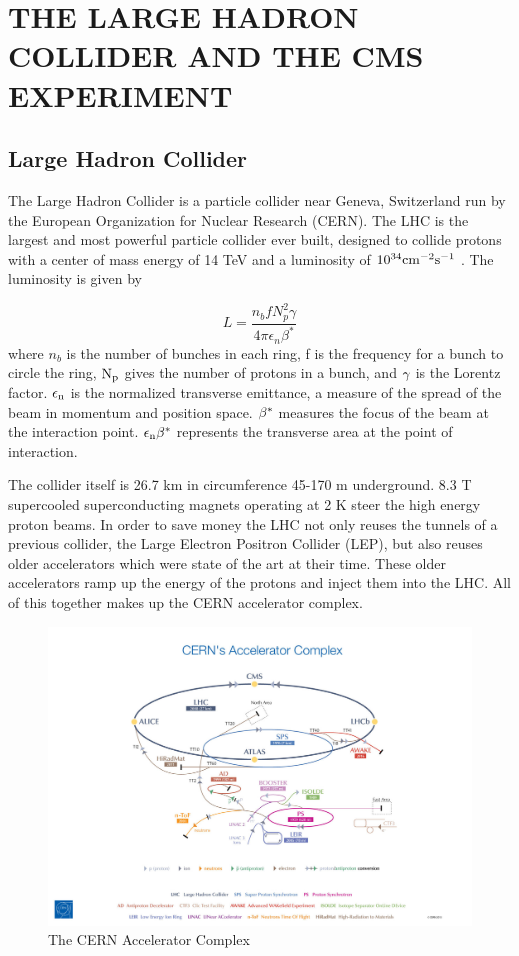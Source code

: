 \chapter{THE LARGE HADRON COLLIDER AND THE CMS EXPERIMENT} \label{lhc-cms}

\section{Large Hadron Collider}
The Large Hadron Collider is a particle collider near Geneva, Switzerland run by the European Organization for Nuclear Research (CERN). The LHC is the largest and most powerful particle collider ever built, designed to collide protons with a center of mass energy of 14 TeV and a luminosity of $10^{34} {\rm cm^{-2}s^{-1}}$ \cite{LHC}. The luminosity is given by

\begin{equation}
L = \frac{n_{b} f N^{2}_{p} \gamma}{4\pi\epsilon_{n}\beta^{*}}
\end{equation}
where $n_{b}$ is the number of bunches in each ring, f is the frequency for a bunch to circle the ring, ${\rm N_{p}}$ gives the number of protons in a bunch, and ${\rm \gamma}$ is the Lorentz factor. ${\rm \epsilon_{n}}$ is the normalized transverse emittance, a measure of the spread of the beam in momentum and position space. ${\rm \beta^{*}}$ measures the focus of the beam at the interaction point. ${\rm \epsilon_{n}\beta^{*}}$ represents the transverse area at the point of interaction.

The collider itself is 26.7 km in circumference 45-170 m underground. 8.3 T supercooled superconducting magnets operating at 2 K steer the high energy proton beams. In order to save money the LHC not only reuses the tunnels of a previous collider, the Large Electron Positron Collider (LEP), but also reuses older accelerators which were state of the art at their time. These older accelerators ramp up the energy of the protons and inject them into the LHC. All of this together makes up the CERN accelerator complex.

\begin{figure}[h!]
  \centering
  \includegraphics[width=6in]{../images/cern_accel_complex.jpg}
  \caption
   {The CERN Accelerator Complex \cite{cernaccelcomplex}}
  \label{fig:cernaccel}
\end{figure}

